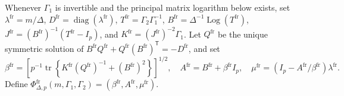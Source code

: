 Whenever \(\Gamma_1\) is invertible and the principal matrix logarithm below exists, set \(\lambda^{\mathrm{fr}}=m/\Delta\), \(D^{\mathrm{fr}}=\operatorname{diag}(\lambda^{\mathrm{fr}})\), \(T^{\mathrm{fr}}=\Gamma_2\Gamma_1^{-1}\), \(B^{\mathrm{fr}}=\Delta^{-1}\operatorname{Log}(T^{\mathrm{fr}})\), \(J^{\mathrm{fr}}=(B^{\mathrm{fr}})^{-1}(T^{\mathrm{fr}}-I_p)\), and \(K^{\mathrm{fr}}=(J^{\mathrm{fr}})^{-2}\Gamma_1\).  Let \(Q^{\mathrm{fr}}\) be the unique symmetric solution of \(B^{\mathrm{fr}}Q^{\mathrm{fr}}+Q^{\mathrm{fr}}(B^{\mathrm{fr}})^{\mathsf T}=-D^{\mathrm{fr}}\), and set
\[
 \beta^{\mathrm{fr}}=\left[p^{-1}\operatorname{tr}\left\{K^{\mathrm{fr}}(Q^{\mathrm{fr}})^{-1}+(B^{\mathrm{fr}})^2\right\}\right]^{1/2},\quad
 A^{\mathrm{fr}}=B^{\mathrm{fr}}+\beta^{\mathrm{fr}}I_p,\quad
 \mu^{\mathrm{fr}}=(I_p-A^{\mathrm{fr}}/\beta^{\mathrm{fr}})\lambda^{\mathrm{fr}}.
\]
Define \(\Phi^{\mathrm{fr}}_{\Delta,p}(m,\Gamma_1,\Gamma_2)=(\beta^{\mathrm{fr}},A^{\mathrm{fr}},\mu^{\mathrm{fr}})\).